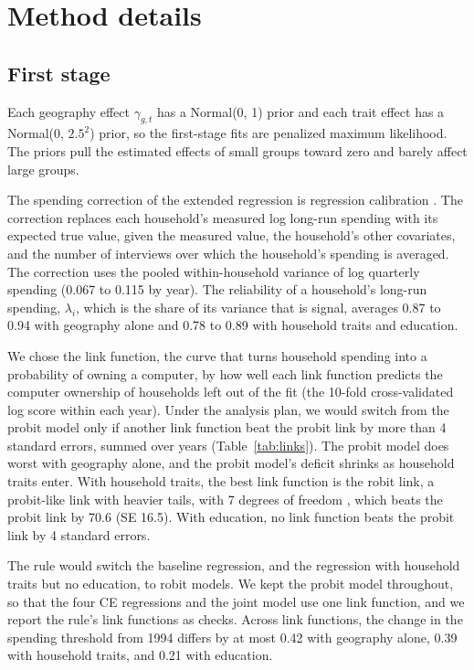 \documentclass[11pt]{article}
\begin{document}
\section{Method details}
\label{app:method}

\subsection{First stage}
\label{app:firststage}

Each geography effect $\gamma_{g,t}$ has a Normal(0, 1) prior and each trait effect has a Normal(0, $2.5^2$) prior, so the first-stage fits are penalized maximum likelihood. The priors pull the estimated effects of small groups toward zero and barely affect large groups.

The spending correction of the extended regression is regression calibration \citep[ch.~4]{carroll2006}. The correction replaces each household's measured log long-run spending with its expected true value, given the measured value, the household's other covariates, and the number of interviews over which the household's spending is averaged. The correction uses the pooled within-household variance of log quarterly spending (0.067 to 0.115 by year). The reliability of a household's long-run spending, $\lambda_i$, which is the share of its variance that is signal, averages 0.87 to 0.94 with geography alone and 0.78 to 0.89 with household traits and education.

We chose the link function, the curve that turns household spending into a probability of owning a computer, by how well each link function predicts the computer ownership of households left out of the fit (the 10-fold cross-validated log score within each year). Under the analysis plan, we would switch from the probit model only if another link function beat the probit link by more than 4 standard errors, summed over years (Table~\ref{tab:links}). The probit model does worst with geography alone, and the probit model's deficit shrinks as household traits enter. With household traits, the best link function is the robit link, a probit-like link with heavier tails, with 7 degrees of freedom \citep{liu2004,gelman2007}, which beats the probit link by 70.6 (SE 16.5). With education, no link function beats the probit link by 4 standard errors.

The rule would switch the baseline regression, and the regression with household traits but no education, to robit models. We kept the probit model throughout, so that the four CE regressions and the joint model use one link function, and we report the rule's link functions as checks. Across link functions, the change in the spending threshold from 1994 differs by at most 0.42 with geography alone, 0.39 with household traits, and 0.21 with education.
\end{document}
